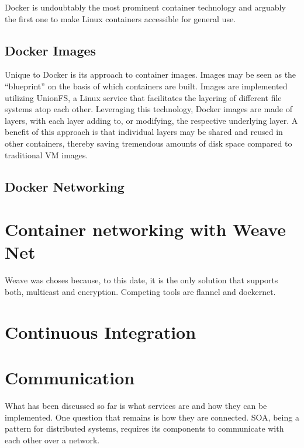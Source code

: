 Docker \cite{DockerWebsite} is undoubtably the most prominent container technology and arguably the first one to make Linux containers accessible for general use. 

\subsection{Docker Images}
Unique to Docker is its approach to container images. Images may be seen as the ``blueprint'' on the basis of which containers are built. 
Images are implemented utilizing UnionFS, a Linux service that facilitates the layering of different file systems atop each other. 
Leveraging this technology, Docker images are made of layers, with each layer adding to, or modifying, the respective underlying layer. 
A benefit of this approach is that individual layers may be shared and reused in other containers, thereby saving tremendous amounts of disk space compared to traditional VM images.

\subsection{Docker Networking}



\section{Container networking with Weave Net}

Weave was choses because, to this date, it is the only solution that supports both, multicast and encryption. Competing tools are flannel and dockernet.




\section{Continuous Integration}



\section{Communication}

What has been discussed so far is what services are and how they can be implemented. One question that remains is how they are connected. SOA, being a pattern for distributed systems, requires its components to communicate with each other over a network.

